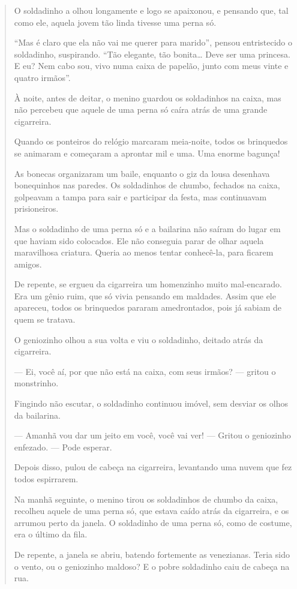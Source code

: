 \begin{quote}
O soldadinho a olhou longamente e logo se apaixonou, e pensando que, tal
como ele, aquela jovem tão linda tivesse uma perna só.

``Mas é claro que ela não vai me querer para marido'', pensou
entristecido o soldadinho, suspirando. ``Tão elegante, tão
bonita\ldots{} Deve ser uma princesa. E eu? Nem cabo sou, vivo numa
caixa de papelão, junto com meus vinte e quatro
irmãos''.

À noite, antes de deitar, o menino guardou os soldadinhos na caixa, mas
não percebeu que aquele de uma perna só caíra atrás de uma grande
cigarreira.

Quando os ponteiros do relógio marcaram meia-noite, todos os brinquedos
se animaram e começaram a aprontar mil e uma. Uma enorme bagunça!

As bonecas organizaram um baile, enquanto o giz da lousa desenhava
bonequinhos nas paredes. Os soldadinhos de chumbo, fechados na caixa,
golpeavam a tampa para sair e participar da festa, mas continuavam
prisioneiros.

Mas o soldadinho de uma perna só e a bailarina não saíram do lugar em
que haviam sido colocados. Ele não conseguia parar de olhar aquela
maravilhosa criatura. Queria ao menos tentar conhecê-la, para ficarem
amigos.

De repente, se ergueu da cigarreira um homenzinho muito mal-encarado.
Era um gênio ruim, que só vivia pensando em maldades. Assim que ele
apareceu, todos os brinquedos pararam amedrontados, pois já sabiam de
quem se tratava.

O geniozinho olhou a sua volta e viu o soldadinho, deitado atrás da
cigarreira.

--- Ei, você aí, por que não está na caixa, com seus irmãos? --- gritou
o monstrinho.

Fingindo não escutar, o soldadinho continuou imóvel, sem desviar os
olhos da bailarina.

--- Amanhã vou dar um jeito em você, você vai ver! --- Gritou o geniozinho
enfezado. --- Pode esperar.

Depois disso, pulou de cabeça na cigarreira, levantando uma nuvem que
fez todos espirrarem.

Na manhã seguinte, o menino tirou os soldadinhos de chumbo da caixa,
recolheu aquele de uma perna só, que estava caído atrás da cigarreira, e
os arrumou perto da janela. O soldadinho de uma perna só, como de
costume, era o último da fila.

De repente, a janela se abriu, batendo fortemente as venezianas. Teria
sido o vento, ou o geniozinho maldoso? E o pobre soldadinho caiu de
cabeça na rua.


\end{quote}
